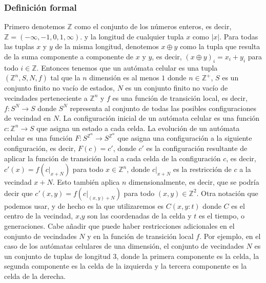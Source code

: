 \subsubsection{Definici\'on formal}
    \label{sec:AutomatasCelDefFormal}
    Primero denotemos $\mathbb{Z}$ como el conjunto de los n\'umeros enteros, es decir, $\mathbb{Z} = (-\infty,-1 ,0,1, \infty)$.
        y la longitud de cualquier tupla $x$ como $|x|$. Para todas las tuplas $x$ y $y$ de la misma longitud, denotemos $x \oplus y$
        como la tupla que resulta de la suma componente a componente de $x$ y $y$, es decir, $(x \oplus y)_i = x_i + y_i$ para todo 
        $i \in \mathbb{Z}$.
    \vskip 0.5cm
    Entonces tenemos que un aut\'omata celular es una tupla $({\mathbb{Z}^{n}},S,N,f)$ tal que la $n$ dimensi\'on es al menos $1$ donde 
        $n \in \mathbb{Z}^{+}$, $S$ es un conjunto finito no vac\'io de estados, $N$ es un conjunto finito no vac\'io de vecindades 
        perteneciente a ${\mathbb{Z}^{n}}$ y $f$ es una funci\'on de transici\'on local, es decir, $f: S^N \rightarrow S$ donde
        $S^N$ representa al conjunto de todas las posibles configuraciones de vecindad en $N$.
    \vskip 0.5cm
    La configuraci\'on inicial de un aut\'omata celular es una funci\'on $c: {\mathbb{Z}^{n}} \rightarrow S$ que asigna un estado a cada celda.
        La evoluci\'on de un aut\'omata celular es una funci\'on $F: S^{{\mathbb{Z}^{n}}} \rightarrow S^{{\mathbb{Z}^{n}}}$ que asigna una configuraci\'on a la siguiente
        configuraci\'on, es decir, $F(c) = c'$, donde $c'$ es la configuraci\'on resultante de aplicar la funci\'on de transici\'on local a cada
        celda de la configuraci\'on $c$, es decir, $c'(x) = f(c|_{x+N})$ para todo $x \in {\mathbb{Z}^{n}}$, donde $c|_{x+N}$ es la restricci\'on de $c$ a la vecindad $x+N$.
        Esto tambi\'en aplica $n$ dimensionalmente, es decir, que se podr\'ia decir que $c'(x,y) = f(c|_{(x,y)+N})$ para todo $(x,y) \in {\mathbb{Z}^{2}}$.
        Otra notaci\'on que podemos usar, y de hecho es la que utilizaremos es $C(x,y:t)$ donde $C$ es el centro de la vecindad, $x$,$y$ son las coordenadas de la celda y $t$ es el tiempo,
        o generaciones.
    \vskip 0.5cm
    Cabe a\~nadir que puede haber restricciones adicionales en el conjunto de vecindades $N$ y en la funci\'on de transici\'on local $f$.
        Por ejemplo, en el caso de los aut\'omatas celulares de una dimensi\'on, el conjunto de vecindades $N$ es un conjunto de tuplas de longitud 3,
        donde la primera componente es la celda, la segunda componente es la celda de la izquierda y la tercera componente es la celda de la derecha.
